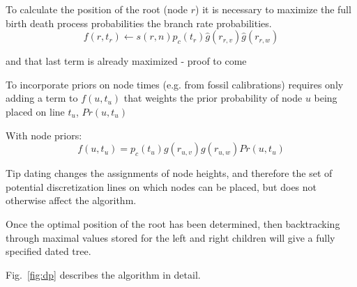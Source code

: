 \documentclass[12pt,letterpaper]{article}
\newcommand{\ejmcomment}[1]{{\color{green} #1}}
\begin{document}
To calculate the position of the root (node $r$) it is necessary to maximize the
full birth death process probabilities the branch rate probabilities.
$$f(r,t_r) \leftarrow s(r,n) p_c(t_{r}) \hat g(r_{r,v}) \hat g(r_{r,w})$$

\ejmcomment{and that last term is already maximized - proof to come}

To incorporate priors on node times (e.g. from fossil calibrations)
requires only adding a term to $f(u,t_u)$ that weights the prior probability of 
node $u$ being placed on line $t_u$, $Pr(u,t_u)$

With node priors:
$$f(u,t_u) = p_c(t_u) g(r_{u,v}) g(r_{u,w}) Pr(u,t_u)$$

Tip dating changes the assignments of node heights, and therefore 
the set of potential discretization lines on which nodes can be placed,
but does not otherwise affect the algorithm.

Once the optimal position of the root has been determined,
then backtracking through maximal values stored for the 
left and right children will give a fully specified dated tree.


Fig.~\ref{fig:dp} describes the algorithm in detail.
\end{document}

